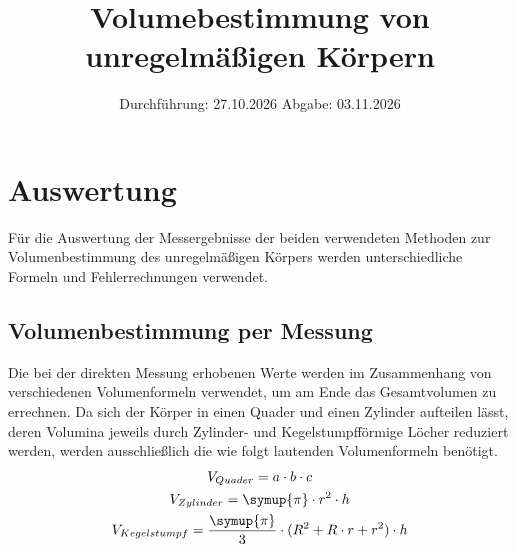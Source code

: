 


\subject{VERSUCH 100}
\title{Volumebestimmung von unregelmäßigen Körpern}
\date{%
  Durchführung: 27.10.2026
  \hspace{3em}
  Abgabe: 03.11.2026
}
\usepackage{subcaption}
\usepackage[section, below]{placeins}
\usepackage[]{caption} %
\usepackage{comment}
\FloatBarrier


\maketitle
\thispagestyle{empty}
\tableofcontents
\newpage

\section{Auswertung}
Für die Auswertung der Messergebnisse der beiden verwendeten Methoden zur Volumenbestimmung des unregelmäßigen Körpers werden unterschiedliche Formeln und Fehlerrechnungen verwendet.
\subsection{Volumenbestimmung per Messung}
Die bei der direkten Messung erhobenen Werte werden im Zusammenhang von verschiedenen Volumenformeln verwendet,
 um am Ende das Gesamtvolumen zu errechnen. 
 Da sich der Körper in einen Quader und einen Zylinder aufteilen lässt, 
 deren Volumina jeweils durch Zylinder- und Kegelstumpfförmige Löcher reduziert werden,
  werden ausschließlich die wie folgt lautenden Volumenformeln benötigt. 
  \begin{gather}
    V_{Quader} = a \cdot b \cdot c \\
    V_{Zylinder} = \symup{\pi} \cdot r^{2} \cdot h\\
    V_{Kegelstumpf} = \frac{\symup{\pi}}{3} \cdot (R^2+R\cdot r +r^2)\cdot h
  \end{gather}
